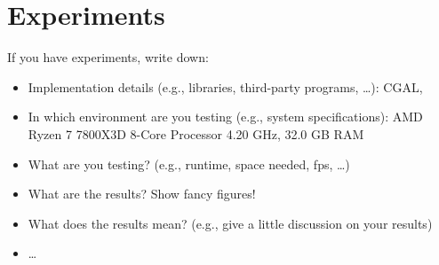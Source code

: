 \chapter{Experiments}
If you have experiments, write down:
\begin{itemize}
	\item Implementation details (e.g., libraries, third-party programs, \dots): CGAL, 
	\item In which environment are you testing (e.g., system specifications): AMD Ryzen 7 7800X3D 8-Core Processor 4.20 GHz, 32.0 GB RAM
	\item What are you testing? (e.g., runtime, space needed, fps, \dots)
	\item What are the results? Show fancy figures!
	\item What does the results mean? (e.g., give a little discussion on your results)
	\item \dots
\end{itemize}